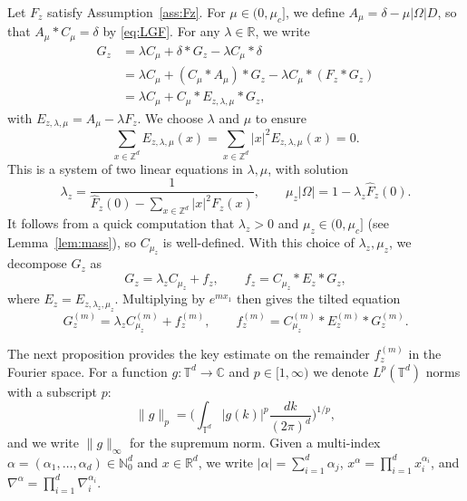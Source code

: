 \documentclass[11pt,hidelinks]{article}
\theoremstyle{plain}
\numberwithin{equation}{section}
\newcommand{\N}{\mathbb{N}}
\newcommand{\Z}{\mathbb{Z}}
\newcommand{\R}{\mathbb{R}}
\newcommand{\C}{\mathbb{C}}
\newcommand{\T}{\mathbb{T}}
\newcommand{\grad}{\nabla}
\renewcommand{\(}{\left(}
\renewcommand{\)}{\right)}
\newcommand{\1}{\mathds{1}}
\newcommand{\nl}{\nonumber \\}
\providecommand{\abs}[1]{\lvert#1\rvert}
\providecommand{\norm}[1]{\lVert#1\rVert}
\newcommand{\muz}{{\mu_z}}
\newcommand{\supm}{^{(m)}}
\begin{document}
Let $F_z$ satisfy Assumption~\ref{ass:Fz}. 
For $\mu \in (0,\mu_c]$, we define $A_\mu = \delta - \mu\abs\Omega D$,
so that $A_\mu * C_\mu = \delta$ by \eqref{eq:LGF}. 
For any $\lambda\in \R$, we write
\begin{align}
G_z
&= \lambda C_\mu + \delta * G_z - \lambda C_\mu * \delta	\nl
&= \lambda C_\mu + (C_\mu * A_\mu) * G_z - \lambda C_\mu * (F_z * G_z)\nl
&= \lambda C_\mu + C_\mu * E_{z,\lambda,\mu} * G_z,
\end{align}
with $E_{z,\lambda,\mu} = A_\mu - \lambda F_z$.
We choose $\lambda$ and $\mu$ to ensure
\begin{equation} \label{eq:E_condition}
\sum_{x\in \Z^d} E_{z,\lambda,\mu}(x) = \sum_{x\in \Z^d} \abs x^2 E_{z,\lambda,\mu}(x) = 0.	
\end{equation}
This is a system of two linear equations in $\lambda,\mu$, with solution 
\begin{equation} \label{eq:lambda_z}
\lambda_z = \frac{1} { \hat F_z(0) - \sum_{x\in \Z^d} \abs x^2 F_z(x) },
\qquad \mu_z\abs\Omega = 1 - \lambda_z \hat F_z(0).
\end{equation}
It follows from a quick computation that $\lambda_z >0$ and $\muz\in (0, \mu_c]$ (see Lemma~\ref{lem:mass}), so $C_\muz$ is well-defined. 
With this choice of $\lambda_z, \mu_z$, we decompose $G_z$ as
\begin{equation}  \label{eq:G_isolate}
G_z = \lambda_z C_\muz + f_z,
\qquad
f_z =  C_\muz * E_z * G_z,
\end{equation}
where $E_z = E_{z,\lambda_z, \muz}$. 
Multiplying by $e^{mx_1}$ then gives the tilted equation
\begin{equation} \label{eq:Gm_decomp}
G_z\supm = \lambda_z C_\muz\supm + f_z\supm,
\qquad
f_z\supm =  C_\muz\supm * E_z\supm * G_z\supm. 
\end{equation}

The next proposition provides the key estimate on the remainder $f_z\supm$ in the Fourier space. 
For a function $g : \T^d \to \C$
and $p \in [1,\infty)$ we denote $L^p(\T^d)$ norms with a subscript $p$:
\begin{equation}
    \norm g _p = \biggl( \int_{\T^d} |g(k)|^p \frac{dk}{(2\pi)^d} \bigg)^{1/p},
\end{equation}
and we write $\norm g_\infty$ for the supremum norm.
Given a multi-index $\alpha = (\alpha_1, \dots, \alpha_d) \in \N_0^d$ and $x\in \R^d$, 
we write $\abs \alpha = \sum_{i=1}^d \alpha_j$, $x^\alpha = \prod_{i=1}^d x_i^{\alpha_i}$, and $\grad^\alpha = \prod_{i=1}^d \grad_i^{\alpha_i}$.
\end{document}
